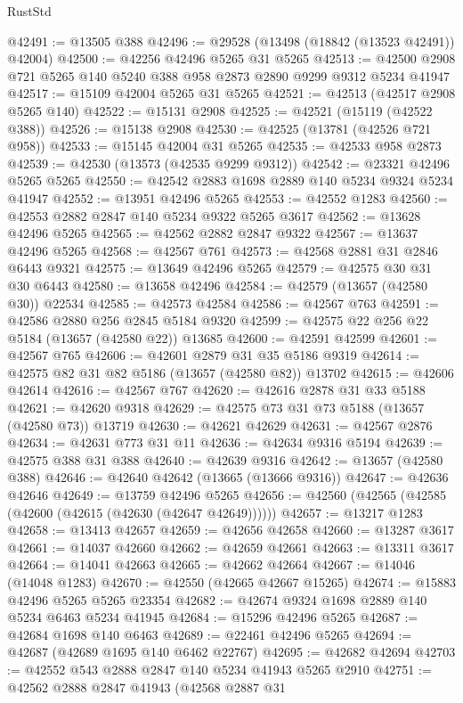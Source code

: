 \begin{lexlean}{RustStd}
\begin{coremodule}
@42491 := @13505 @388
@42496 := @29528 (@13498 (@18842 (@13523 @42491)) @42004)
@42500 := @42256 @42496 @5265 @31 @5265
@42513 := @42500 @2908 @721 @5265 @140 @5240 @388 @958 @2873 @2890 @9299 @9312 @5234 @41947
@42517 := @15109 @42004 @5265 @31 @5265
@42521 := @42513 (@42517 @2908 @5265 @140)
@42522 := @15131 @2908
@42525 := @42521 (@15119 (@42522 @388))
@42526 := @15138 @2908
@42530 := @42525 (@13781 (@42526 @721 @958))
@42533 := @15145 @42004 @31 @5265
@42535 := @42533 @958 @2873
@42539 := @42530 (@13573 (@42535 @9299 @9312))
@42542 := @23321 @42496 @5265 @5265
@42550 := @42542 @2883 @1698 @2889 @140 @5234 @9324 @5234 @41947
@42552 := @13951 @42496 @5265
@42553 := @42552 @1283
@42560 := @42553 @2882 @2847 @140 @5234 @9322 @5265 @3617
@42562 := @13628 @42496 @5265
@42565 := @42562 @2882 @2847 @9322
@42567 := @13637 @42496 @5265
@42568 := @42567 @761
@42573 := @42568 @2881 @31 @2846 @6443 @9321
@42575 := @13649 @42496 @5265
@42579 := @42575 @30 @31 @30 @6443
@42580 := @13658 @42496
@42584 := @42579 (@13657 (@42580 @30)) @22534
@42585 := @42573 @42584
@42586 := @42567 @763
@42591 := @42586 @2880 @256 @2845 @5184 @9320
@42599 := @42575 @22 @256 @22 @5184 (@13657 (@42580 @22)) @13685
@42600 := @42591 @42599
@42601 := @42567 @765
@42606 := @42601 @2879 @31 @35 @5186 @9319
@42614 := @42575 @82 @31 @82 @5186 (@13657 (@42580 @82)) @13702
@42615 := @42606 @42614
@42616 := @42567 @767
@42620 := @42616 @2878 @31 @33 @5188
@42621 := @42620 @9318
@42629 := @42575 @73 @31 @73 @5188 (@13657 (@42580 @73)) @13719
@42630 := @42621 @42629
@42631 := @42567 @2876
@42634 := @42631 @773 @31 @11
@42636 := @42634 @9316 @5194
@42639 := @42575 @388 @31 @388
@42640 := @42639 @9316
@42642 := @13657 (@42580 @388)
@42646 := @42640 @42642 (@13665 (@13666 @9316))
@42647 := @42636 @42646
@42649 := @13759 @42496 @5265
@42656 := @42560 (@42565 (@42585 (@42600 (@42615 (@42630 (@42647 @42649))))))
@42657 := @13217 @1283
@42658 := @13413 @42657
@42659 := @42656 @42658
@42660 := @13287 @3617
@42661 := @14037 @42660
@42662 := @42659 @42661
@42663 := @13311 @3617
@42664 := @14041 @42663
@42665 := @42662 @42664
@42667 := @14046 (@14048 @1283)
@42670 := @42550 (@42665 @42667 @15265)
@42674 := @15883 @42496 @5265 @5265 @23354
@42682 := @42674 @9324 @1698 @2889 @140 @5234 @6463 @5234 @41945
@42684 := @15296 @42496 @5265
@42687 := @42684 @1698 @140 @6463
@42689 := @22461 @42496 @5265
@42694 := @42687 (@42689 @1695 @140 @6462 @22767)
@42695 := @42682 @42694
@42703 := @42552 @543 @2888 @2847 @140 @5234 @41943 @5265 @2910
@42751 := @42562
    @2888
    @2847
    @41943
    (@42568
      @2887
      @31

\end{coremodule}
\end{lexlean}
